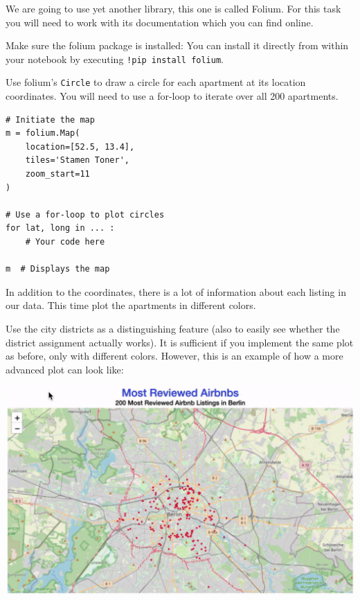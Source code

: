 \documentclass[
  11pt,
]{article}
\newenvironment{tipsp}[1]
  {
  \begin{itemize}
  \footnotesize
  \renewcommand{\labelitemi}{
    \raisebox{-.7\height}[0pt][0pt]{
      {\setkeys{Gin}{width=3em,keepaspectratio}
        \texttt{[image: images/\#1.png]}}
    }
  }
  \setlength{\fboxsep}{1em}
  \begin{pbox}
  \item
  }
  {
  \end{pbox}
  \end{itemize}
  }
\begin{document}
\begin{tipsp}p

We are going to use yet another library, this one is called Folium. For this task you will need to work with its documentation which you can find online.

Make sure the folium package is installed: You can install it directly from within your notebook by executing \texttt{!pip\ install\ folium}.

Use folium's \texttt{Circle} to draw a circle for each apartment at its location coordinates. You will need to use a for-loop to iterate over all 200 apartments.

\begin{verbatim}
# Initiate the map
m = folium.Map(
    location=[52.5, 13.4],
    tiles='Stamen Toner',
    zoom_start=11
)

# Use a for-loop to plot circles
for lat, long in ... :
    # Your code here

m  # Displays the map
\end{verbatim}

\end{tipsp}

In addition to the coordinates, there is a lot of information about each listing in our data. This time plot the apartments in different colors.

Use the city districts as a distinguishing feature (also to easily see whether the district assignment actually works). It is sufficient if you implement the same plot as before, only with different colors. However, this is an example of how a more advanced plot can look like:

\begin{center}\includegraphics[width=1\linewidth]{plot/01_python/map_circles} \end{center}
\end{document}
